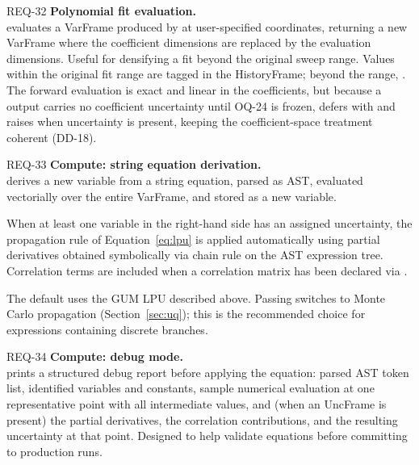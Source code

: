 \begin{reqbox}{REQ-32}{\stable}
\textbf{Polynomial fit evaluation.}\\
 evaluates a
VarFrame produced by  at user-specified coordinates,
returning a new VarFrame where the coefficient dimensions are replaced by
the evaluation dimensions. Useful for densifying a fit beyond the original
sweep range. Values within the original fit range are tagged  in
the HistoryFrame; beyond the range, . The forward evaluation is
exact and linear in the coefficients, but because a 
output carries no coefficient uncertainty until OQ-24 is frozen,
 defers with  and raises when
uncertainty is present, keeping the coefficient-space treatment
coherent (DD-18).
\end{reqbox}

\begin{reqbox}{REQ-33}{\stable}
\textbf{Compute: string equation derivation.}\\
 derives a new variable from a string
equation, parsed as AST, evaluated vectorially over the entire VarFrame,
and stored as a new variable.

When at least one variable in the right-hand side has an assigned
uncertainty, the propagation rule of Equation~\eqref{eq:lpu} is applied
automatically using partial derivatives obtained symbolically via chain
rule on the AST expression tree. Correlation terms are included when a
correlation matrix has been declared via .

The default  uses the GUM LPU described above.
Passing  switches to Monte Carlo propagation
(Section~\ref{sec:uq}); this is the recommended choice for expressions
containing discrete branches.
\end{reqbox}

\begin{reqbox}{REQ-34}{\stable}
\textbf{Compute: debug mode.}\\
 prints a structured debug
report before applying the equation: parsed AST token list, identified
variables and constants, sample numerical evaluation at one representative
point with all intermediate values, and (when an UncFrame is present) the
partial derivatives, the correlation contributions, and the resulting
uncertainty at that point. Designed to help validate equations before
committing to production runs.
\end{reqbox}

